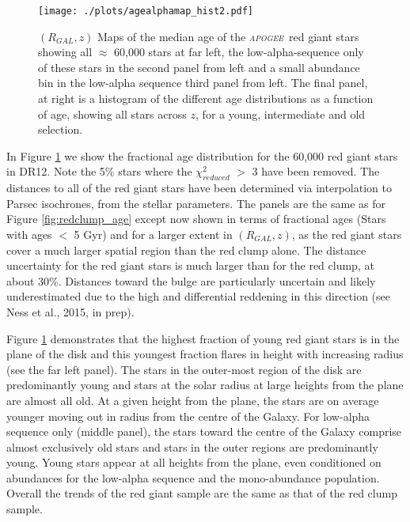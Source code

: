 \documentclass[12pt, preprint]{aastex}
\newcommand{\project}[1]{\textsl{#1}}
\newcommand{\apogee}{\project{\textsc{apogee}}}
\begin{document}
\begin{figure}[p]
\centering
              \texttt{[image: ./plots/agealphamap\_hist2.pdf]}
    \caption{$(R_{GAL},z)$ Maps of the median age of the \apogee\  red giant stars showing all $\approx$ 60,000 stars at far left, the low-alpha-sequence only of these stars in the second panel from left and a small abundance bin in the low-alpha sequence third panel from left. The final panel, at right is a histogram of the different age distributions as a function of age, showing all stars across $z$, for a young, intermediate and old selection.  }
\label{fig:allage}
\end{figure}

In Figure \ref{fig:allage} we show the fractional age distribution for the 60,000 red giant stars in DR12. Note the 5\% stars where the $\chi_{reduced}^2$ $>$ 3 have been removed. The distances to all of the red giant stars have been determined via interpolation to Parsec isochrones, from the stellar parameters. The panels are the same as for Figure \ref{fig:redclump_age} except now shown in terms of fractional ages (Stars with ages $<$ 5 Gyr) and for a larger extent in $(R_{GAL},z)$, as the red giant stars cover a much larger spatial region than the red clump alone. The distance uncertainty for the red giant stars is much larger than for the red clump, at about 30\%. Distances toward the bulge are particularly uncertain and likely underestimated due to the high and differential reddening in this direction (see Ness et al., 2015, in prep).  

Figure \ref{fig:allage} demonstrates that the highest fraction of young red giant stars is in the plane of the disk and this youngest fraction flares in height with increasing radius (see the far left panel).  The stars in the outer-most region of the disk are predominantly young and stars at the solar radius at large heights from the plane are almost all old. At a given height from the plane, the stars are on average younger moving out in radius from the centre of the Galaxy. For low-alpha sequence only (middle panel), the stars toward the centre of the Galaxy comprise almost exclusively old stars and stars in the outer regions are predominantly young.  Young stars appear at all heights from the plane, even conditioned on abundances for the low-alpha sequence and the mono-abundance population. Overall the trends of the red giant sample are the same as that of the red clump sample. 
\end{document}
